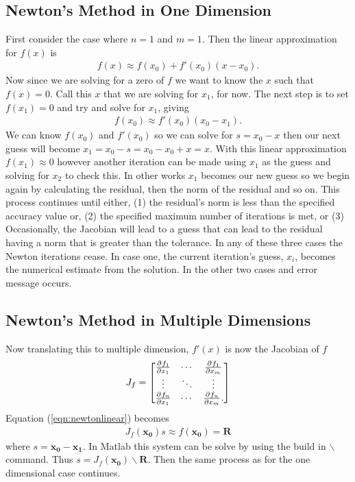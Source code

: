 \subsection{Newton's Method in One Dimension}

First consider the case where $n=1$ and $m=1$. Then the linear approximation for $f(x)$ is
\begin{eqnarray}
 f(x) \approx f(x_0) + f'(x_0)(x-x_0).
\end{eqnarray}
Now since we are solving for a zero of $f$ we want to know the $x$ such that $f(x)=0$. Call this $x$ that we are solving for $x_1$, for now. The next step is to set $f(x_1) =0$ and try and solve for $x_1$, giving
\begin{eqnarray} \label{eqn:newtonlinear}
f(x_0) \approx f'(x_0)(x_0-x_1).
\end{eqnarray}
We can know $f(x_0)$ and $f'(x_0)$ so we can solve for $s = x_0-x$ then our next guess will become $x_1 = x_0-s = x_0-x_0+x=x$. With this linear approximation $f(x_1) \approx 0$ however another iteration can be made using $x_1$ as the guess and solving for $x_2$ to check this. In other works $x_1$ becomes our new guess so we begin again by calculating the residual, then the norm of the residual and so on. This process continues until either, (1) the residual's norm is less than the specified accuracy value or, (2) the specified maximum number of iterations is met, or (3) Occasionally, the Jacobian will lead to a guess that can lead to the residual having a norm that is greater than the tolerance. In any of these three cases the Newton iterations cease. In case one, the current iteration's guess, $x_i$, becomes the numerical estimate from the solution. In the other two cases and error message occurs. 


\subsection{Newton's Method in Multiple Dimensions}


Now translating this to multiple dimension, $f'(x)$ is now the Jacobian of $f$
\begin{eqnarray}
J_f = \begin{bmatrix}
\frac{\partial^{} f_1}{\partial {x_1}^{}} & \cdots & \frac{\partial^{} f_1}{\partial {x_m}^{}} \\
\vdots & \ddots & \vdots \\
\frac{\partial^{} f_n}{\partial {x_1}^{}} & \cdots & \frac{\partial^{} f_n}{\partial {x_m}^{}}.
\end{bmatrix}
\end{eqnarray}
Equation (\ref{eqn:newtonlinear}) becomes 
\begin{eqnarray}
J_f(\mathbf{x_0})s \approx f(\mathbf{x_0}) = \mathbf{R}
\end{eqnarray}
where $s = \mathbf{x_0} - \mathbf{x_1}$. In Matlab this system can be solve by using the build in $\backslash$ command. Thus $s = J_f(\mathbf{x_0})\backslash \mathbf{R}$. Then the same process as for the one dimensional case continues. 

